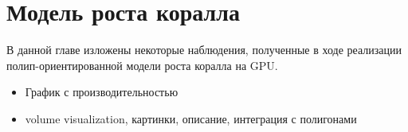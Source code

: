 \chapter{Модель роста коралла}

В данной главе изложены некоторые наблюдения, полученные в ходе реализации полип-ориентированной модели роста коралла на GPU. 

\begin{itemize}
  \item График с производительностью 
  \item volume visualization, картинки, описание, интеграция с полигонами
\end{itemize}

